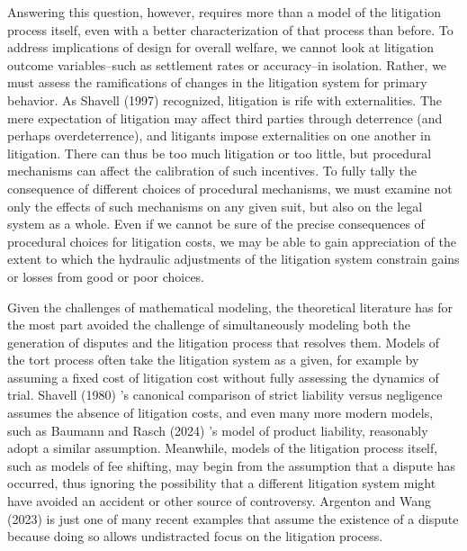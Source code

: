 \documentclass{article}
\begin{document}
Answering this question, however, requires more than a model of the litigation process itself, even with a better characterization of that process than before. To address implications of design for overall welfare, we cannot look at litigation outcome variables--such as settlement rates or accuracy--in isolation. Rather, we must assess the ramifications of changes in the litigation system for primary behavior. As Shavell (1997) \cite{shavell1997} recognized, litigation is rife with externalities. The mere expectation of litigation may affect third parties through deterrence (and perhaps overdeterrence), and litigants impose externalities on one another in litigation. There can thus be too much litigation or too little, but procedural mechanisms can affect the calibration of such incentives. To fully tally the consequence of different choices of procedural mechanisms, we must examine not only the effects of such mechanisms on any given suit, but also on the legal system as a whole. Even if we cannot be sure of the precise consequences of procedural choices for litigation costs, we may be able to gain appreciation of the extent to which the hydraulic adjustments of the litigation system constrain gains or losses from good or poor choices. 

Given the challenges of mathematical modeling, the theoretical literature has for the most part avoided the challenge of simultaneously modeling both the generation of disputes and the litigation process that resolves them. Models of the tort process often take the litigation system as a given, for example by assuming a fixed cost of litigation cost without fully assessing the dynamics of trial. Shavell (1980) \cite{shavell1980}'s canonical comparison of strict liability versus negligence assumes the absence of litigation costs, and even many more modern models, such as Baumann and Rasch (2024) \cite{baumannrasch}'s model of product liability, reasonably adopt a similar assumption. Meanwhile, models of the litigation process itself, such as models of fee shifting, may begin from the assumption that a dispute has occurred, thus ignoring the possibility that a different litigation system might have avoided an accident or other source of controversy. Argenton and Wang (2023) \cite{argentonwang} is just one of many recent examples that assume the existence of a dispute because doing so allows undistracted focus on the litigation process.
\end{document}
